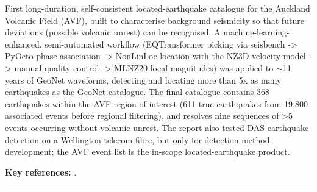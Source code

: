 \documentclass[10pt,a4paper]{article}
\newcommand{\catentryrule}{\par\vspace{3pt}\noindent\textcolor{rulegrey}{\rule{\linewidth}{0.3pt}}\par\vspace{5pt}}
\begin{document}
\par\vspace{2pt}First long-duration, self-consistent located-earthquake catalogue for the Auckland Volcanic Field (AVF), built to characterise background seismicity so that future deviations (possible volcanic unrest) can be recognised. A machine-learning-enhanced, semi-automated workflow (EQTransformer picking via seisbench -\textgreater{} PyOcto phase association -\textgreater{} NonLinLoc location with the NZ3D velocity model -\textgreater{} manual quality control -\textgreater{} MLNZ20 local magnitudes) was applied to $\sim$11 years of GeoNet waveforms, detecting and locating more than 5x as many earthquakes as the GeoNet catalogue. The final catalogue contains 368 earthquakes within the AVF region of interest (611 true earthquakes from 19,800 associated events before regional filtering), and resolves nine sequences of \textgreater{}5 events occurring without volcanic unrest. The report also tested DAS earthquake detection on a Wellington telecom fibre, but only for detection-method development; the AVF event list is the in-scope located-earthquake product.
\par\vspace{2pt}\textbf{Key references:} \cite{Chamberlain2025,OHagan2025,OHagan2025a}.
\catentryrule
\end{document}
